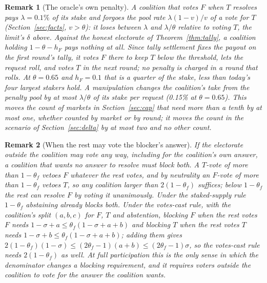 \documentclass[conference,compsoc]{IEEEtran}
\newtheorem{remark}{Remark}
\newcommand{\hF}{h_{F}}
\begin{document}
\begin{remark}[The oracle's own penalty]
\label{rem:penalty}
 A coalition that votes $F$ when $T$ resolves pays $\lambda = 0.1\%$ of its stake and forgoes the pool rate $\lambda(1 - v)/v$ of a vote for $T$ (Section~\ref{sec:facts}, $v > \theta$): it loses between $\lambda$ and $\lambda/\theta$ relative to voting $T$, the limit's $\delta$ above. Against the honest electorate of Theorem~\ref{thm:tally}, a coalition holding $1 - \theta - \hF$ pays nothing at all. Since tally settlement fixes the payout on the first round's tally, it votes $F$ there to keep $T$ below the threshold, lets the request roll, and votes $T$ in the next round; no penalty is charged in a round that rolls. At $\theta = 0.65$ and $\hF = 0.1$ that is a quarter of the stake, less than today's four largest stakers hold. A manipulation changes the coalition's take from the penalty pool by at most $\lambda/\theta$ of its stake per request (0.15\% at $\theta = 0.65$). This moves the count of markets in Section~\ref{sec:cap} that need more than a tenth by at most one, whether counted by market or by round; it moves the count in the scenario of Section~\ref{sec:delta} by at most two and no other count.
\end{remark}

\begin{remark}[When the rest may vote the blocker's answer]
\label{rem:rest}
 If the electorate outside the coalition may vote any way, including for the coalition's own answer, a coalition that wants no answer to resolve must block both. A $T$-vote of more than $1 - \theta_f$ vetoes $F$ whatever the rest votes, and by neutrality an $F$-vote of more than $1 - \theta_f$ vetoes $T$, so any coalition larger than $2(1 - \theta_f)$ suffices; below $1 - \theta_f$ the rest can resolve $F$ by voting it unanimously. Under the staked-supply rule $1 - \theta_f$ abstaining already blocks both. Under the votes-cast rule, with the coalition's split $(a, b, c)$ for $F$, $T$ and abstention, blocking $F$ when the rest votes $F$ needs $1 - \sigma + a \le \theta_f(1 - \sigma + a + b)$ and blocking $T$ when the rest votes $T$ needs $1 - \sigma + b \le \theta_f(1 - \sigma + a + b)$; adding them gives $2(1 - \theta_f)(1 - \sigma) \le (2\theta_f - 1)(a + b) \le (2\theta_f - 1)\sigma$, so the votes-cast rule needs $2(1 - \theta_f)$ as well. At full participation this is the only sense in which the denominator changes a blocking requirement, and it requires voters outside the coalition to vote for the answer the coalition wants.
\end{remark}
\end{document}
